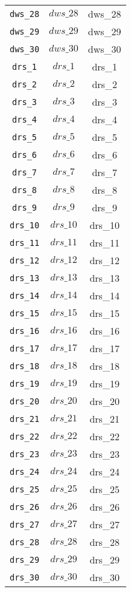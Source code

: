 \begin{center}
\begin{longtable}{ccc}
\texttt{dws\_28} & $dws\_28$ & dws\_28\\
\texttt{dws\_29} & $dws\_29$ & dws\_29\\
\texttt{dws\_30} & $dws\_30$ & dws\_30\\
\texttt{drs\_1} & $drs\_1$ & drs\_1\\
\texttt{drs\_2} & $drs\_2$ & drs\_2\\
\texttt{drs\_3} & $drs\_3$ & drs\_3\\
\texttt{drs\_4} & $drs\_4$ & drs\_4\\
\texttt{drs\_5} & $drs\_5$ & drs\_5\\
\texttt{drs\_6} & $drs\_6$ & drs\_6\\
\texttt{drs\_7} & $drs\_7$ & drs\_7\\
\texttt{drs\_8} & $drs\_8$ & drs\_8\\
\texttt{drs\_9} & $drs\_9$ & drs\_9\\
\texttt{drs\_10} & $drs\_10$ & drs\_10\\
\texttt{drs\_11} & $drs\_11$ & drs\_11\\
\texttt{drs\_12} & $drs\_12$ & drs\_12\\
\texttt{drs\_13} & $drs\_13$ & drs\_13\\
\texttt{drs\_14} & $drs\_14$ & drs\_14\\
\texttt{drs\_15} & $drs\_15$ & drs\_15\\
\texttt{drs\_16} & $drs\_16$ & drs\_16\\
\texttt{drs\_17} & $drs\_17$ & drs\_17\\
\texttt{drs\_18} & $drs\_18$ & drs\_18\\
\texttt{drs\_19} & $drs\_19$ & drs\_19\\
\texttt{drs\_20} & $drs\_20$ & drs\_20\\
\texttt{drs\_21} & $drs\_21$ & drs\_21\\
\texttt{drs\_22} & $drs\_22$ & drs\_22\\
\texttt{drs\_23} & $drs\_23$ & drs\_23\\
\texttt{drs\_24} & $drs\_24$ & drs\_24\\
\texttt{drs\_25} & $drs\_25$ & drs\_25\\
\texttt{drs\_26} & $drs\_26$ & drs\_26\\
\texttt{drs\_27} & $drs\_27$ & drs\_27\\
\texttt{drs\_28} & $drs\_28$ & drs\_28\\
\texttt{drs\_29} & $drs\_29$ & drs\_29\\
\texttt{drs\_30} & $drs\_30$ & drs\_30\\
\hline%
\end{longtable}
\end{center}
